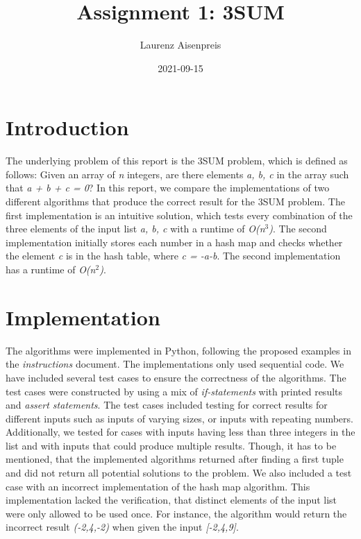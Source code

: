 \documentclass[12pt, a4paper]{article}
\title{Assignment 1: 3SUM}
\author{Laurenz Aisenpreis}
\date{2021-09-15}
\begin{document}
\maketitle

\section{Introduction}

The underlying problem of this report is the 3SUM problem, which is defined as follows: Given an array of \emph{n} integers, are there elements \emph{a, b, c} in the array such that \emph{a + b + c  = 0}?
In this report, we compare the implementations of two different algorithms that produce the correct result for the 3SUM problem. \linebreak
The first implementation is an intuitive solution, which tests every combination of the three elements of the input list \emph{a, b, c} with a runtime of \emph{O(n$^3$)}. The second implementation initially stores each number in a hash map and checks whether the element \emph{c} is in the hash table, where \emph{c = -a-b}. The second implementation has a runtime of \emph{O(n$^2$)}.


\section{Implementation}

The algorithms were implemented in Python, following the proposed examples in the \emph{instructions} document. The implementations only used sequential code. \newline
We have included several test cases to ensure the correctness of the algorithms. The test cases were constructed by using a mix of \emph{if-statements} with printed results and \emph{assert statements}. The test cases included testing for correct results for different inputs such as inputs of varying sizes, or inputs with repeating numbers. Additionally, we tested for cases with inputs having less than three integers in the list and with inputs that could produce multiple results. Though, it has to be mentioned, that the implemented algorithms returned after finding a first tuple and did not return all potential solutions to the problem. \newline
We also included a test case with an incorrect implementation of the hash map algorithm. This implementation lacked the verification, that distinct elements of the input list were only allowed to be used once. For instance, the algorithm would return the incorrect result \emph{(-2,4,-2)} when given the input \emph{[-2,4,9]}.
\end{document}
